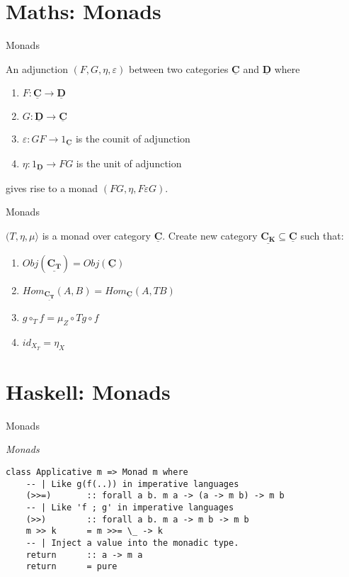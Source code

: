 \documentclass[10pt]{beamer}
\newcommand{\Cat}[1]{\ensuremath{\underline{\mathbf{#1}}}}
\theoremstyle{definition}
\theoremstyle{remark}
\numberwithin{equation}{section}
\begin{document}
\section{Maths: Monads}

\begin{frame}[fragile]{Monads}

An adjunction $(F,G,\eta,\varepsilon)$ between two categories $\Cat{C}$ and $\Cat{D}$ where
\begin{enumerate}
\item $F: \Cat{C}\to \Cat{D}$
\item $G: \Cat{D}\to \Cat{C}$
\item $\varepsilon: GF\to 1_{\Cat{C}}$ is the counit of adjunction
\item $\eta: 1_{\Cat{D}}\to FG$ is the unit of adjunction
\end{enumerate}
gives rise to a monad $(FG,\eta,F\varepsilon G)$.
  
\end{frame}

\begin{frame}[fragile]{Monads}

  $(T,\eta,\mu〉$ is a monad over category $\Cat{C}$.
    Create new category $\Cat{C_K} \subseteq \Cat{C}$ such that:

    \begin{enumerate}
      \item $Obj(\Cat{C_T}) = Obj(\Cat{C})$
      \item $Hom_{\Cat{C_T}}(A,B) = Hom_{\Cat{C}}(A,T B)$
      \item $g \circ_{T} f = \mu_{Z} \circ T g \circ f$
      \item $id_{X_T} = \eta_{X}$
    \end{enumerate}

\end{frame}


\section{Haskell: Monads}

\begin{frame}[fragile]{Monads}

  \emph{Monads}

  \begin{lstlisting}[frame=single]
class Applicative m => Monad m where
    -- | Like g(f(..)) in imperative languages
    (>>=)       :: forall a b. m a -> (a -> m b) -> m b
    -- | Like 'f ; g' in imperative languages
    (>>)        :: forall a b. m a -> m b -> m b
    m >> k      = m >>= \_ -> k
    -- | Inject a value into the monadic type.
    return      :: a -> m a
    return      = pure
  \end{lstlisting}

\end{frame}
\end{document}
